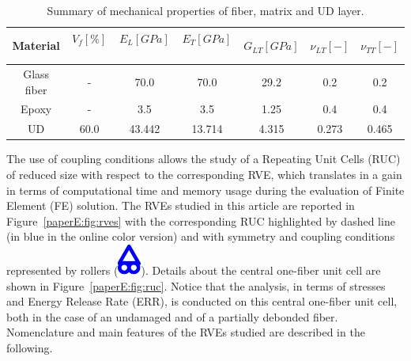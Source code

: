 \begin{table}[!htbp]
 \centering
 \caption{Summary of mechanical properties of fiber, matrix and UD layer.}%
 \begin{tabular}{ccccccc}
\textbf{Material} & \textbf{$V_{f}\left[\%\right]$}\  & \textbf{$E_{L}\left[GPa\right]$}\ & \textbf{$E_{T}\left[GPa\right]$}\  & \textbf{$G_{LT}\left[GPa\right]$} &\textbf{$\nu_{LT}\left[-\right]$} & \textbf{$\nu_{TT}\left[-\right]$} \\
\midrule
Glass fiber &-   & 70.0 & 70.0  & 29.2 & 0.2  & 0.2\\
Epoxy    &-& 3.5 & 3.5   & 1.25 &  0.4& 0.4\\
UD&60.0&43.442&13.714& 4.315& 0.273&0.465\\
\end{tabular}
\label{paperE:tab:phaseprop}
\end{table}

The use of coupling conditions allows the study of a Repeating Unit Cells (RUC) of reduced size with respect to the corresponding RVE, which translates in a gain in terms of computational time and memory usage during the evaluation of Finite Element (FE) solution. The RVEs studied in this article are reported in Figure~\ref{paperE:fig:rves} with the corresponding RUC highlighted by dashed line (in blue in the online color version) and with symmetry and coupling conditions represented by rollers (\includegraphics[scale=0.5]{paperE/roller.pdf}). Details about the central one-fiber unit cell are shown in Figure~\ref{paperE:fig:ruc}. Notice that the analysis, in terms of stresses and Energy Release Rate (ERR), is conducted on this central one-fiber unit cell, both in the case of an undamaged and of a partially debonded fiber.\\
Nomenclature and main features of the RVEs studied are described in the following.

